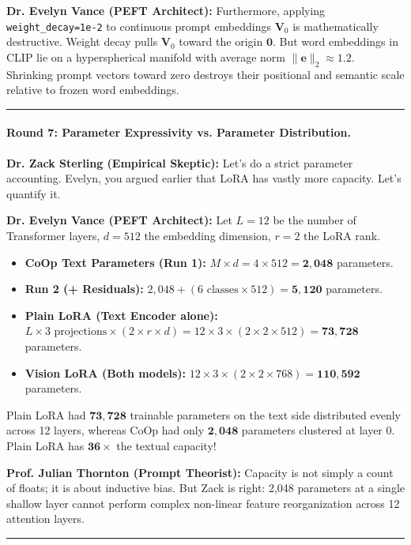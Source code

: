 \documentclass[letterpaper,11pt,leqno]{article}
\newcommand{\speakerVance}[1]{\noindent\textbf{\color{purple!80!black}Dr. Evelyn Vance (PEFT Architect):} #1\vspace{0.4em}}
\newcommand{\speakerThornton}[1]{\noindent\textbf{\color{blue!70!black}Prof. Julian Thornton (Prompt Theorist):} #1\vspace{0.4em}}
\newcommand{\speakerSterling}[1]{\noindent\textbf{\color{red!75!black}Dr. Zack Sterling (Empirical Skeptic):} #1\vspace{0.4em}}
\begin{document}
\speakerVance{Furthermore, applying \texttt{weight\_decay=1e-2} to continuous prompt embeddings $\mathbf{V}_0$ is mathematically destructive. Weight decay pulls $\mathbf{V}_0$ toward the origin $\mathbf{0}$. But word embeddings in CLIP lie on a hyperspherical manifold with average norm $\|\mathbf{e}\|_2 \approx 1.2$. Shrinking prompt vectors toward zero destroys their positional and semantic scale relative to frozen word embeddings.}

\vspace{0.8em}\hrule\vspace{0.8em}

\paragraph{Round 7: Parameter Expressivity vs. Parameter Distribution.}
\speakerSterling{Let's do a strict parameter accounting. Evelyn, you argued earlier that LoRA has vastly more capacity. Let's quantify it.}

\speakerVance{Let $L=12$ be the number of Transformer layers, $d=512$ the embedding dimension, $r=2$ the LoRA rank.
\begin{itemize}
    \item \textbf{CoOp Text Parameters (Run 1):} $M \times d = 4 \times 512 = \mathbf{2,048}$ parameters.
    \item \textbf{Run 2 (+ Residuals):} $2,048 + (6 \text{ classes} \times 512) = \mathbf{5,120}$ parameters.
    \item \textbf{Plain LoRA (Text Encoder alone):} $L \times 3 \text{ projections} \times (2 \times r \times d) = 12 \times 3 \times (2 \times 2 \times 512) = \mathbf{73,728}$ parameters.
    \item \textbf{Vision LoRA (Both models):} $12 \times 3 \times (2 \times 2 \times 768) = \mathbf{110,592}$ parameters.
\end{itemize}
Plain LoRA had $\mathbf{73,728}$ trainable parameters on the text side distributed evenly across 12 layers, whereas CoOp had only $\mathbf{2,048}$ parameters clustered at layer 0. Plain LoRA has $\mathbf{36\times}$ the textual capacity!}

\speakerThornton{Capacity is not simply a count of floats; it is about inductive bias. But Zack is right: 2,048 parameters at a single shallow layer cannot perform complex non-linear feature reorganization across 12 attention layers.}

\vspace{0.8em}\hrule\vspace{0.8em}
\end{document}
